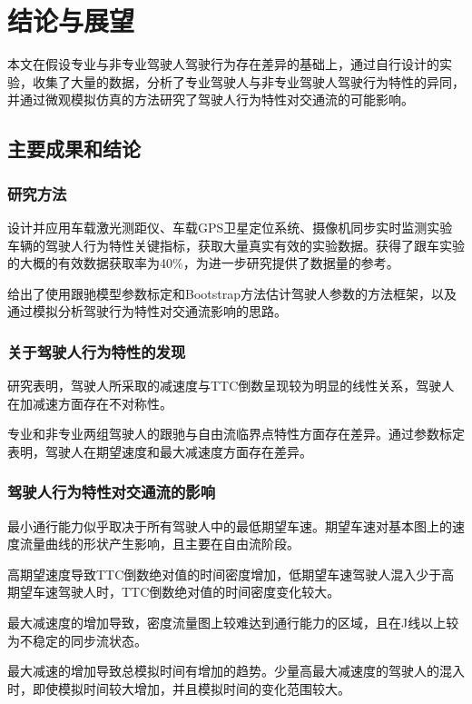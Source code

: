 \chapter{结论与展望}

本文在假设专业与非专业驾驶人驾驶行为存在差异的基础上，通过自行设计的实验，收集了大量的数据，分析了专业驾驶人与非专业驾驶人驾驶行为特性的异同，并通过微观模拟仿真的方法研究了驾驶人行为特性对交通流的可能影响。

\section{主要成果和结论}
\subsection{研究方法}
设计并应用车载激光测距仪、车载GPS卫星定位系统、摄像机同步实时监测实验车辆的驾驶人行为特性关键指标，获取大量真实有效的实验数据。获得了跟车实验的大概的有效数据获取率为40\%，为进一步研究提供了数据量的参考。

给出了使用跟驰模型参数标定和Bootstrap方法估计驾驶人参数的方法框架，以及通过模拟分析驾驶行为特性对交通流影响的思路。

\subsection{关于驾驶人行为特性的发现}
研究表明，驾驶人所采取的减速度与TTC倒数呈现较为明显的线性关系，驾驶人在加减速方面存在不对称性。

专业和非专业两组驾驶人的跟驰与自由流临界点特性方面存在差异。通过参数标定表明，驾驶人在期望速度和最大减速度方面存在差异。


\subsection{驾驶人行为特性对交通流的影响}

最小通行能力似乎取决于所有驾驶人中的最低期望车速。期望车速对基本图上的速度流量曲线的形状产生影响，且主要在自由流阶段。

高期望速度导致TTC倒数绝对值的时间密度增加，低期望车速驾驶人混入少于高期望车速驾驶人时，TTC倒数绝对值的时间密度变化较大。


最大减速度的增加导致，密度流量图上较难达到通行能力的区域，且在J线以上较为不稳定的同步流状态。

最大减速的增加导致总模拟时间有增加的趋势。少量高最大减速度的驾驶人的混入时，即使模拟时间较大增加，并且模拟时间的变化范围较大。

